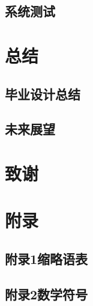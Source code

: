 \documentclass[a4paper,AutoFakeBold,oneside,12pt]{book}
\begin{document}
\section{系统测试}


\chapter{总结}

\section{毕业设计总结}
\section{未来展望}

\begin{nopagenumber}
\clearpage{}


\clearpage
\chapter{致\qquad{}谢}
\normalsize\thankwords

\setcounter{figure}{0} 
\renewcommand{\thefigure}{~附-\arabic{figure}~}
\setcounter{equation}{0} 
\renewcommand{\theequation}{~附-\arabic{equation}~}
\setcounter{table}{0} 
\renewcommand{\thetable}{~附-\arabic{table}~}
\setcounter{lstlisting}{0} 
\makeatletter
  \renewcommand \thelstlisting
       {附-\@arabic\c@lstlisting}
\makeatother


\chapter*{附\qquad{}录}

{}
\section*{附录1\quad{}缩略语表}



\clearpage
{}
{}
\section*{附录2\quad{}数学符号}



\end{nopagenumber}

\blankmatter
 


\blankmatter
 
\end{document}
